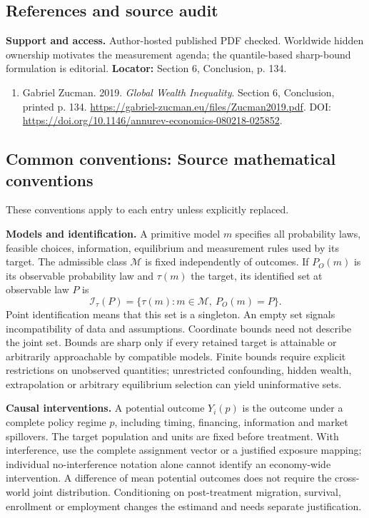 \documentclass[11pt,a4paper]{article}
\begin{document}
\subsection*{References and source audit}
\textbf{Support and access.} Author-hosted published PDF checked. Worldwide hidden ownership motivates the measurement agenda; the quantile-based sharp-bound formulation is editorial. \textbf{Locator:} Section 6, Conclusion, p. 134.
\begin{enumerate}\raggedright
\item\hypertarget{definitions:source:30007643:1}{} Gabriel Zucman. 2019. \emph{Global Wealth Inequality}. Section 6, Conclusion, printed p. 134.
\url{https://gabriel-zucman.eu/files/Zucman2019.pdf}.
DOI: \url{https://doi.org/10.1146/annurev-economics-080218-025852}.
\end{enumerate}

\subsection*{Common conventions: Source mathematical conventions}

These conventions apply to each entry unless explicitly replaced.

\textbf{Models and identification.} A primitive model \(m\) specifies all probability laws, feasible choices, information, equilibrium and measurement rules used by its target. The admissible class \(\mathcal M\) is fixed independently of outcomes. If \(P_O(m)\) is its observable probability law and \(\tau(m)\) the target, its identified set at observable law \(P\) is
\[
 \mathcal I_\tau(P)=\{\tau(m):m\in\mathcal M,\ P_O(m)=P\}.
\]
Point identification means that this set is a singleton. An empty set signals incompatibility of data and assumptions. Coordinate bounds need not describe the joint set. Bounds are sharp only if every retained target is attainable or arbitrarily approachable by compatible models. Finite bounds require explicit restrictions on unobserved quantities; unrestricted confounding, hidden wealth, extrapolation or arbitrary equilibrium selection can yield uninformative sets.

\textbf{Causal interventions.} A potential outcome \(Y_i(p)\) is the outcome under a complete policy regime \(p\), including timing, financing, information and market spillovers. The target population and units are fixed before treatment. With interference, use the complete assignment vector or a justified exposure mapping; individual no-interference notation alone cannot identify an economy-wide intervention. A difference of mean potential outcomes does not require the cross-world joint distribution. Conditioning on post-treatment migration, survival, enrollment or employment changes the estimand and needs separate justification.
\end{document}

